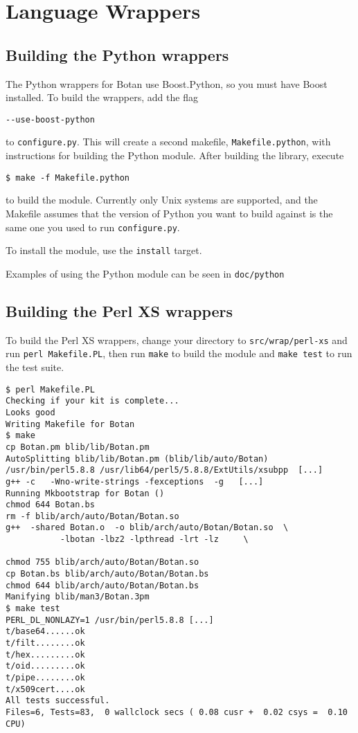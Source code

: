 \documentclass{article}
\newcommand{\filename}[1]{\texttt{#1}}
\begin{document}
\pagebreak

\section{Language Wrappers}

\subsection{Building the Python wrappers}

The Python wrappers for Botan use Boost.Python, so you must have Boost
installed. To build the wrappers, add the flag

\verb|--use-boost-python|

to \verb|configure.py|. This will create a second makefile,
\verb|Makefile.python|, with instructions for building the Python
module. After building the library, execute

\begin{verbatim}
$ make -f Makefile.python
\end{verbatim}

to build the module. Currently only Unix systems are supported, and
the Makefile assumes that the version of Python you want to build
against is the same one you used to run \verb|configure.py|.

To install the module, use the \verb|install| target.

Examples of using the Python module can be seen in \filename{doc/python}

\subsection{Building the Perl XS wrappers}

To build the Perl XS wrappers, change your directory to
\filename{src/wrap/perl-xs} and run \verb|perl Makefile.PL|, then run
\verb|make| to build the module and \verb|make test| to run the test
suite.

\begin{verbatim}
$ perl Makefile.PL
Checking if your kit is complete...
Looks good
Writing Makefile for Botan
$ make
cp Botan.pm blib/lib/Botan.pm
AutoSplitting blib/lib/Botan.pm (blib/lib/auto/Botan)
/usr/bin/perl5.8.8 /usr/lib64/perl5/5.8.8/ExtUtils/xsubpp  [...]
g++ -c   -Wno-write-strings -fexceptions  -g   [...]
Running Mkbootstrap for Botan ()
chmod 644 Botan.bs
rm -f blib/arch/auto/Botan/Botan.so
g++  -shared Botan.o  -o blib/arch/auto/Botan/Botan.so  \
           -lbotan -lbz2 -lpthread -lrt -lz     \

chmod 755 blib/arch/auto/Botan/Botan.so
cp Botan.bs blib/arch/auto/Botan/Botan.bs
chmod 644 blib/arch/auto/Botan/Botan.bs
Manifying blib/man3/Botan.3pm
$ make test
PERL_DL_NONLAZY=1 /usr/bin/perl5.8.8 [...]
t/base64......ok
t/filt........ok
t/hex.........ok
t/oid.........ok
t/pipe........ok
t/x509cert....ok
All tests successful.
Files=6, Tests=83,  0 wallclock secs ( 0.08 cusr +  0.02 csys =  0.10 CPU)
\end{verbatim}
\end{document}
